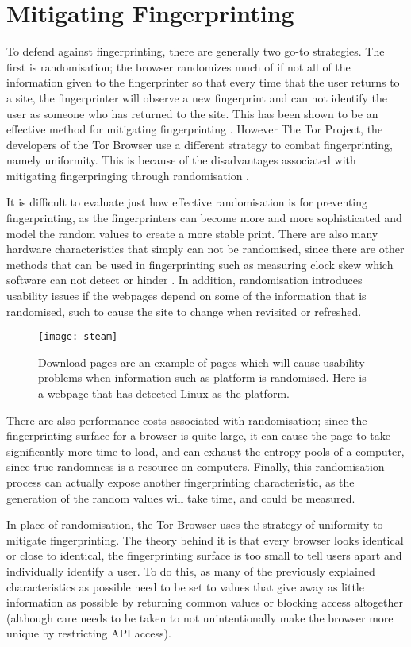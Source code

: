 \chapter{Mitigating Fingerprinting}

To defend against fingerprinting, there are generally two go-to strategies.
The first is randomisation; the browser randomizes much of if not all of the information given to the fingerprinter so that every time that the user returns to a site, the fingerprinter will observe a new fingerprint and can not identify the user as someone who has returned to the site.
This has been shown to be an effective method for mitigating fingerprinting \citep{privaricator}.
However The Tor Project, the developers of the Tor Browser use a different strategy to combat fingerprinting, namely uniformity.
This is because of the disadvantages associated with mitigating fingerpringing through randomisation \citep{tor-project}.

It is difficult to evaluate just how effective randomisation is for preventing fingerprinting, as the fingerprinters can become more and more sophisticated and model the random values to create a more stable print.
There are also many hardware characteristics that simply can not be randomised, since there are other methods that can be used in fingerprinting such as measuring clock skew which software can not detect or hinder \citep{skew}.
In addition, randomisation introduces usability issues if the webpages depend on some of the information that is randomised, such to cause the site to change when revisited or refreshed.

\begin{figure}[h]
\texttt{[image: steam]}
\centering
\label{fig:steam}
\caption{Download pages are an example of pages which will cause usability problems when information such as platform is randomised.
Here is a webpage that has detected Linux as the platform.}
\end{figure}

There are also performance costs associated with randomisation; since the fingerprinting surface for a browser is quite large, it can cause the page to take significantly more time to load, and can exhaust the entropy pools of a computer, since true randomness is a resource on computers.
Finally, this randomisation process can actually expose another fingerprinting characteristic, as the generation of the random values will take time, and could be measured.

In place of randomisation, the Tor Browser uses the strategy of uniformity to mitigate fingerprinting.
The theory behind it is that every browser looks identical or close to identical, the fingerprinting surface is too small to tell users apart and individually identify a user.
To do this, as many of the previously explained characteristics as possible need to be set to values that give away as little information as possible by returning common values or blocking access altogether (although care needs to be taken to not unintentionally make the browser more unique by restricting API access).

